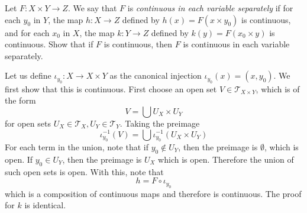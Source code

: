   \begin{exercise}[Munkres 18.11]
    Let $F : X \times Y \to Z$. We say that $F$ is \emph{continuous in each variable separately} if for each $y_0$ in $Y$, the map $h : X \to Z$ defined by $h(x) = F(x \times y_0)$ is continuous, and for each $x_0$ in $X$, the map $k : Y \to Z$ defined by $k(y) = F(x_0 \times y)$ is continuous. Show that if $F$ is continuous, then $F$ is continuous in each variable separately.
  \end{exercise}
  \begin{solution}
    Let us define $\iota_{y_0}: X \rightarrow X \times Y$ as the canonical injection $\iota_{y_0}(x) = (x, y_0)$. We first show that this is continuous. First choose an open set $V \in \mathscr{T}_{X \times Y}$, which is of the form 
    \begin{equation}
      V = \bigcup U_X \times U_Y
    \end{equation}
    for open sets $U_X \in \mathscr{T}_X, U_Y \in \mathscr{T}_Y$. Taking the preimage 
    \begin{equation}
      \iota_{y_0}^{-1} (V) = \bigcup \iota_{y_0}^{-1} (U_X \times U_Y)
    \end{equation}
    For each term in the union, note that if $y_0 \not\in U_Y$, then the preimage is $\emptyset$, which is open. If $y_0 \in U_Y$, then the preimage is $U_X$ which is open. Therefore the union of such open sets is open. With this, note that 
    \begin{equation}
      h = F \circ \iota_{y_0}
    \end{equation}
    which is a composition of continuous maps and therefore is continuous. The proof for $k$ is identical. 
  \end{solution}

